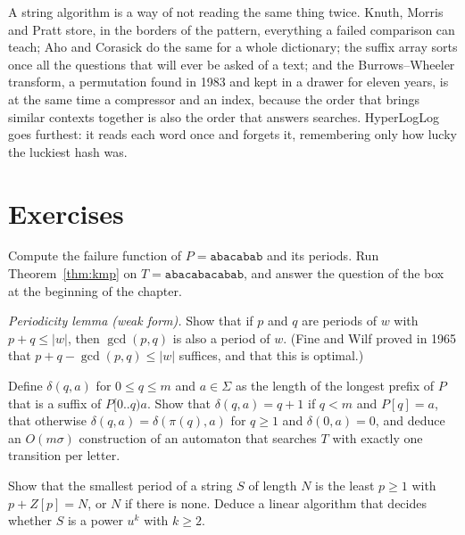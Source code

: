 \begin{beauty}
A string algorithm is a way of not reading the same thing twice. Knuth, Morris and Pratt store, in the borders of the pattern, everything a failed comparison can teach; Aho and Corasick do the same for a whole dictionary; the suffix array sorts once all the questions that will ever be asked of a text; and the Burrows--Wheeler transform, a permutation found in 1983 and kept in a drawer for eleven years, is at the same time a compressor and an index,
because the order that brings similar contexts together is also the order that answers searches. HyperLogLog goes furthest: it reads each word once and forgets it, remembering only how lucky the luckiest hash was.
\end{beauty}

\section{Exercises}

\begin{exercise}[$\star$]\label{ex:pifunction}
Compute the failure function of $P=\texttt{abacabab}$ and its periods. Run Theorem~\ref{thm:kmp} on $T=\texttt{abacabacabab}$, and answer the question of the box at the beginning of the chapter.
\end{exercise}

\begin{exercise}[$\star\star$]\label{ex:periodicity}
\emph{Periodicity lemma (weak form).} Show that if $p$ and $q$ are periods of $w$ with $p+q\le|w|$, then $\gcd(p,q)$ is also a period of $w$. (Fine and Wilf proved in 1965 that $p+q-\gcd(p,q)\le|w|$ suffices, and that this is optimal.)
\end{exercise}

\begin{exercise}[$\star$]\label{ex:kmpautomaton}
Define $\delta(q,a)$ for $0\le q\le m$ and $a\in\Sigma$ as the length of the longest prefix of $P$ that is a suffix of $P[0..q)a$. Show that $\delta(q,a)=q+1$ if $q<m$ and $P[q]=a$, that otherwise $\delta(q,a)=\delta(\pi(q),a)$ for $q\ge1$ and $\delta(0,a)=0$, and deduce an $O(m\sigma)$ construction of an automaton that searches $T$ with exactly one transition per letter.
\end{exercise}

\begin{exercise}[$\star$]\label{ex:zperiod}
Show that the smallest period of a string $S$ of length $N$ is the least $p\ge1$ with $p+Z[p]=N$, or $N$ if there is none. Deduce a linear algorithm that decides whether $S$ is a power $u^k$ with $k\ge2$.
\end{exercise}

